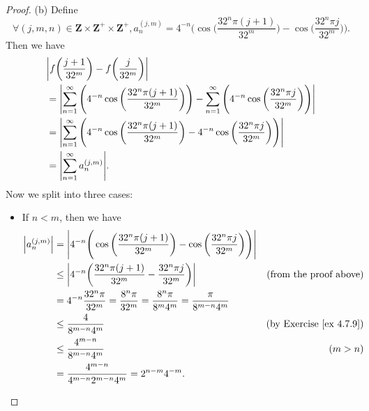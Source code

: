 \begin{proof}{(b)}
    Define
    \[
        \forall (j, m, n) \in \mathbf{Z} \times \mathbf{Z}^+ \times \mathbf{Z}^+, a_n^{(j, m)} = 4^{-n} \Bigg(\cos\bigg(\frac{32^n \pi (j + 1)}{32^m}\bigg) - \cos\bigg(\frac{32^n \pi j}{32^m}\bigg)\Bigg).
    \]
    Then we have
    \begin{align*}
         & \abs*{f\bigg(\frac{j + 1}{32^m}\bigg) - f\bigg(\frac{j}{32^m}\bigg)}                                                                                                           \\
         & = \abs*{\sum_{n = 1}^\infty \Bigg(4^{-n} \cos\bigg(\frac{32^n \pi (j + 1)}{32^m}\bigg)\Bigg) - \sum_{n = 1}^\infty \Bigg(4^{-n} \cos\bigg(\frac{32^n \pi j}{32^m}\bigg)\Bigg)} \\
         & = \abs*{\sum_{n = 1}^\infty \Bigg(4^{-n} \cos\bigg(\frac{32^n \pi (j + 1)}{32^m}\bigg) - 4^{-n} \cos\bigg(\frac{32^n \pi j}{32^m}\bigg)\Bigg)}                                 \\
         & = \abs*{\sum_{n = 1}^\infty a_n^{(j, m)}}.
    \end{align*}
    Now we split into three cases:
    \begin{itemize}
        \item If \(n < m\), then we have
              \begin{align*}
                  \abs*{a_n^{(j, m)}} & = \abs*{4^{-n} \Bigg(\cos\bigg(\frac{32^n \pi (j + 1)}{32^m}\bigg) - \cos\bigg(\frac{32^n \pi j}{32^m}\bigg)\Bigg)}                                       \\
                                      & \leq \abs*{4^{-n} \bigg(\frac{32^n \pi (j + 1)}{32^m} - \frac{32^n \pi j}{32^m}\bigg)}                              & \text{(from the proof above)}       \\
                                      & = 4^{-n} \frac{32^n \pi}{32^m} = \frac{8^n \pi}{32^m} = \frac{8^n \pi}{8^m 4^m} = \frac{\pi}{8^{m - n} 4^m}                                               \\
                                      & \leq \frac{4}{8^{m - n} 4^m}                                                                                        & \text{(by Exercise \ref{ex 4.7.9})} \\
                                      & \leq \frac{4^{m - n}}{8^{m - n} 4^m}                                                                                & (m > n)                             \\
                                      & = \frac{4^{m - n}}{4^{m - n} 2^{m - n} 4^m} = 2^{n - m} 4^{-m}.

\end{align*}
\end{itemize}
\end{proof}
